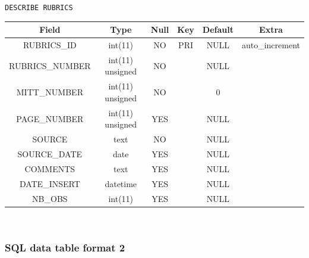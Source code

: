 \documentclass[12pt]{article}
\begin{document}
{\centering
    \caption{\texttt{DESCRIBE RUBRICS}}
    \begin{tabular}{c|c|c|c|c|c}%
        \textbf{Field} & \textbf{Type} & \textbf{Null} & \textbf{Key} & \textbf{Default} & \textbf{Extra}  \\
        \hline
        RUBRICS\_ID & int(11) & NO & PRI & NULL & auto\_increment \\
        
        RUBRICS\_NUMBER & int(11) unsigned & NO && NULL & \\
        
        MITT\_NUMBER & int(11) unsigned & NO && 0 &  \\
        
        PAGE\_NUMBER & int(11) unsigned & YES && NULL &  \\
        
        SOURCE & text & NO && NULL &  \\
        
        SOURCE\_DATE & date & YES && NULL & \\
        
        COMMENTS & text & YES && NULL &  \\
        
        DATE\_INSERT & datetime & YES && NULL &  \\
        
        NB\_OBS & int(11) & YES && NULL & \\
        
    \end{tabular}
    \label{tab:data-og}
\par}\\


\subsubsection{SQL data table format 2}

\end{document}
